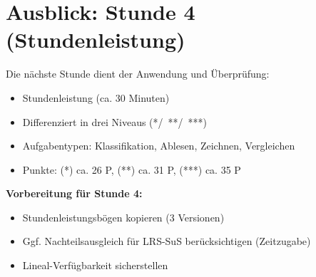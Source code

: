 \documentclass[11pt,a4paper]{article}
\begin{document}
\section*{Ausblick: Stunde 4 (Stundenleistung)}

Die nächste Stunde dient der Anwendung und Überprüfung:
\begin{itemize}[leftmargin=2em]
    \item Stundenleistung (ca. 30 Minuten)
    \item Differenziert in drei Niveaus (*/~**/~***)
    \item Aufgabentypen: Klassifikation, Ablesen, Zeichnen, Vergleichen
    \item Punkte: (*) ca. 26 P, (**) ca. 31 P, (***) ca. 35 P
\end{itemize}

\begin{warnbox}
\textbf{Vorbereitung für Stunde 4:}
\begin{itemize}[leftmargin=1.5em]
    \item Stundenleistungsbögen kopieren (3 Versionen)
    \item Ggf. Nachteilsausgleich für LRS-SuS berücksichtigen (Zeitzugabe)
    \item Lineal-Verfügbarkeit sicherstellen
\end{itemize}
\end{warnbox}
\end{document}
